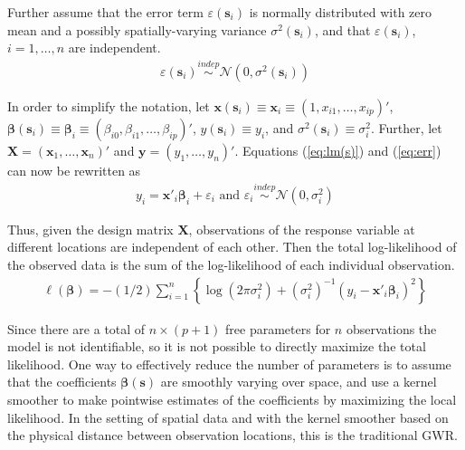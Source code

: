 \documentclass[authoryear, review, 11pt]{elsarticle}
\begin{document}
	Further assume that the error term $\varepsilon(\bm{s}_i)$ is normally distributed with zero mean and a possibly spatially-varying variance $\sigma^2(\bm{s}_i)$, and that $\varepsilon(\bm{s}_i)$, $i=1, \dots, n$ are independent.
	\begin{align} \label{eq:err}
		\varepsilon(\bm{s}_i) \overset{indep}{\sim} \mathcal{N} \left( 0,\sigma^2(\bm{s}_i) \right)
	\end{align}
	
	In order to simplify the notation, let $\bm{x}(\bm{s}_i) \equiv \bm{x}_i \equiv \left( 1, x_{i1}, \dots, x_{ip} \right)'$, $\bm{\beta}(\bm{s}_i) \equiv \bm{\beta}_i \equiv \left(\beta_{i0}, \beta_{i1}, \dots, \beta_{ip} \right)'$, $y(\bm{s}_i) \equiv y_i$, and $\sigma^2(\bm{s}_i) \equiv \sigma^2_i$. Further, let $\bm{X} = \left( \bm{x}_1, \dots, \bm{x}_n \right)'$ and $\bm{y} = \left( y_1, \dots, y_n \right)'$. Equations (\ref{eq:lm(s)}) and (\ref{eq:err}) can now be rewritten as
	\begin{align}
		y_i = \bm{x}'_i \bm{\beta}_i + \varepsilon_i \text{ and } \varepsilon_i \overset{indep}{\sim} \mathcal{N} \left( 0,\sigma_i^2 \right)
	\end{align}
	
	Thus, given the design matrix $\bm{X}$, observations of the response variable at different locations are independent of each other. Then the total log-likelihood of the observed data is the sum of the log-likelihood of each individual observation.
	 \begin{align}
	 	\ell\left( \bm{\beta} \right) = - \left(1/2\right) \sum_{i=1}^n \left\{  \log \left( 2 \pi \sigma^2_i\right) +  \left(\sigma^{2}_i\right)^{-1}  \left(y_i - \bm{x}'_i\bm{\beta}_i \right)^2  \right\}
	\end{align}
	
	Since there are a total of $n \times (p+1)$ free parameters for $n$ observations the model is not identifiable, so it is not possible to directly maximize the total likelihood. One way to effectively reduce the number of parameters is to assume that the coefficients $\bm{\beta}(\bm{s})$ are smoothly varying over space, and use a kernel smoother to make pointwise estimates of the coefficients by maximizing the local likelihood. In the setting of spatial data and with the kernel smoother based on the physical distance between observation locations, this is the traditional GWR.
		
\end{document}
